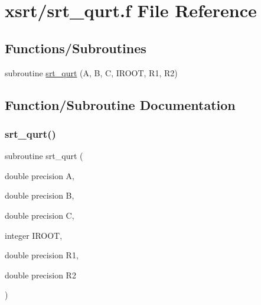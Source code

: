 \hypertarget{srt__qurt_8f}{}\section{xsrt/srt\+\_\+qurt.f File Reference}
\label{srt__qurt_8f}
\subsection*{Functions/\+Subroutines}
\begin{DoxyCompactItemize}
\item 
subroutine \hyperlink{srt__qurt_8f_a016e34333cc6c7592376636fee03d2ff}{srt\+\_\+qurt} (A, B, C, I\+R\+O\+OT, R1, R2)
\end{DoxyCompactItemize}


\subsection{Function/\+Subroutine Documentation}
\mbox{\label{srt__qurt_8f_a016e34333cc6c7592376636fee03d2ff}} 
\subsubsection{\texorpdfstring{srt\+\_\+qurt()}{srt\_qurt()}}
{\footnotesize\ttfamily subroutine srt\+\_\+qurt (\begin{DoxyParamCaption}\item[{double precision}]{A,  }\item[{double precision}]{B,  }\item[{double precision}]{C,  }\item[{integer}]{I\+R\+O\+OT,  }\item[{double precision}]{R1,  }\item[{double precision}]{R2 }\end{DoxyParamCaption})}

